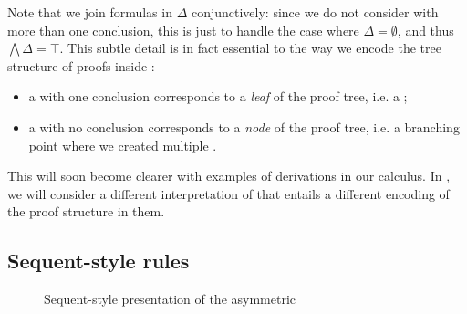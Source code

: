 \begin{scope}
Note that we join formulas in $\Delta$ conjunctively: since we do not consider
 with more than one conclusion, this is just to handle the case where
$\Delta = \emptyset$, and thus $\bigwedge \Delta = \top$. This subtle detail is
in fact essential to the way we encode the tree structure of proofs inside
:
\begin{itemize}
\item a  with one conclusion corresponds to a \emph{leaf} of the proof
tree, i.e. a ;
\item a  with no conclusion corresponds to a \emph{node} of the proof
tree, i.e. a branching point where we created multiple .
\end{itemize}
This will soon become clearer with examples of derivations in our calculus. In
, we will consider a different interpretation of  that
entails a different encoding of the proof structure in them.

\subsection{Sequent-style rules}

\begin{figure*}

\caption{Sequent-style presentation of the asymmetric  }
\end{figure*}


\end{scope}
